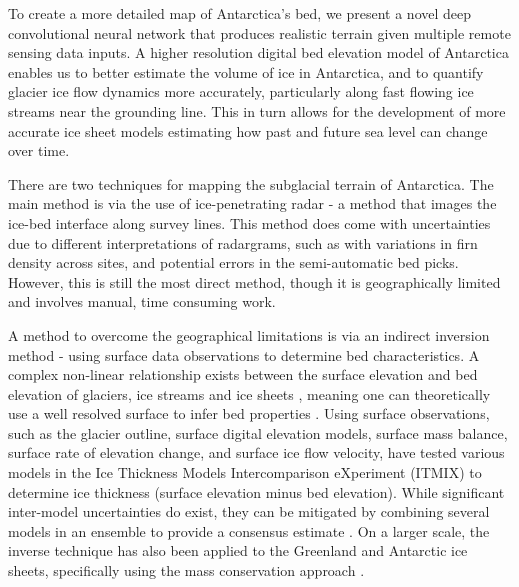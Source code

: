 \documentclass[tc, manuscript]{copernicus}
\begin{document}


\introduction  %

To create a more detailed map of Antarctica's bed, we present a novel deep convolutional neural network that produces realistic terrain given multiple remote sensing data inputs.
A higher resolution digital bed elevation model of Antarctica enables us to better estimate the volume of ice in Antarctica, and to quantify glacier ice flow dynamics more accurately, particularly along fast flowing ice streams near the grounding line.
This in turn allows for the development of more accurate ice sheet models estimating how past and future sea level can change over time.

There are two techniques for mapping the subglacial terrain of Antarctica.
The main method is via the use of ice-penetrating radar - a method that images the ice-bed interface along survey lines.
This method does come with uncertainties due to different interpretations of radargrams, such as with variations in firn density across sites, and potential errors in the semi-automatic bed picks.
However, this is still the most direct method, though it is geographically limited and involves manual, time consuming work.

A method to overcome the geographical limitations is via an indirect inversion method - using surface data observations to determine bed characteristics.
A complex non-linear relationship exists between the surface elevation and bed elevation of glaciers, ice streams and ice sheets \citep{Raymondrelationshipsurfacebasal2005}, meaning one can theoretically use a well resolved surface to infer bed properties \citep[e.g.][]{Farinottimethodestimateice2009}.
Using surface observations, such as the glacier outline, surface digital elevation models, surface mass balance, surface rate of elevation change, and surface ice flow velocity, \citet{FarinottiHowaccurateare2017} have tested various models in the Ice Thickness Models Intercomparison eXperiment (ITMIX) to determine ice thickness (surface elevation minus bed elevation).
While significant inter-model uncertainties do exist, they can be mitigated by combining several models in an ensemble to provide a consensus estimate \citep{Farinotticonsensusestimateice2019}.
On a larger scale, the inverse technique has also been applied to the Greenland \citep{MorlighemBedMachinev3Complete2017} and Antarctic \citep{MorlighemDeepglacialtroughs2019} ice sheets, specifically using the mass conservation approach \citep{Morlighemmassconservationapproach2011}.
\end{document}
